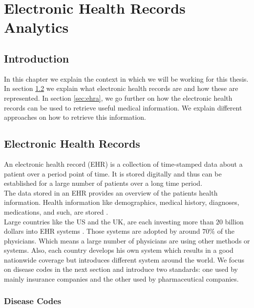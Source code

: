 \graphicspath{ {Context/Images/} }


\chapter{Electronic Health Records Analytics}
\label{cha:context}

\section{Introduction}

In this chapter we explain the context in which we will be working for this thesis. \\

In section \ref{sec:ehr} we explain what electronic health records are and how these are represented. In section \ref{sec:ehra}, we go further on how the electronic health records can be used to retrieve useful medical information. We explain different approaches on how to retrieve this information.


\section{Electronic Health Records}
\label{sec:ehr}

An electronic health record (EHR) is a collection of time-stamped data about a patient over a period point of time. It is stored digitally and thus can be established for a large number of patients over a long time period. \\
The data stored in an EHR provides an overview of the patients health information. Health information like demographics, medical history, diagnoses, medications, and such, are stored \cite{HealthIT:online}. \\

Large countries like the US and the UK, are each investing more than $20$ billion dollars into EHR systems \cite{EHRworld:article}. Those systems are adopted by around $70$\% of the physicians. Which means a large number of physicians are using other methods or systems. Also, each country develops his own system which results in a good nationwide coverage but introduces different system around the world. We focus on disease codes in the next section and introduce two standards: one used by mainly insurance companies and the other used by pharmaceutical companies.


\subsection{Disease Codes}


